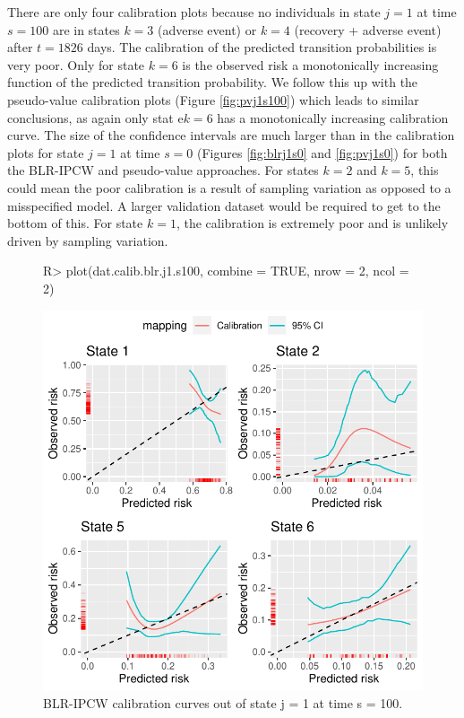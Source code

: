 \documentclass[article,shortnames]{jss}
\begin{document}
There are only four calibration plots because no individuals in state $j = 1$ at time $s = 100$ are in states $k = 3$ (adverse event) or $k = 4$ (recovery + adverse event) after $t = 1826$ days. The calibration of the predicted transition probabilities is very poor. Only for state $k = 6$ is the observed risk a monotonically increasing function of the predicted transition probability. We follow this up with the pseudo-value calibration plots (Figure \ref{fig:pvj1s100}) which leads to similar conclusions, as again only stat e$k = 6$ has a monotonically increasing calibration curve. The size of the confidence intervals are much larger than in the calibration plots for state $j = 1$ at time $s = 0$ (Figures \ref{fig:blrj1s0} and \ref{fig:pvj1s0}) for both the BLR-IPCW and pseudo-value approaches. For states $k = 2$ and $k = 5$, this could mean the poor calibration is a result of sampling variation as opposed to a misspecified model. A larger validation dataset would be required to get to the bottom of this. For state $k = 1$, the calibration is extremely poor and is unlikely driven by sampling variation.

\begin{figure}
\centering
\begin{Schunk}
\begin{Sinput}
R> plot(dat.calib.blr.j1.s100, combine = TRUE, nrow = 2, ncol = 2)
\end{Sinput}
\end{Schunk}
\includegraphics{calibmsm-jss-TEST-012}
\caption{\label{fig:blrj1s100} BLR-IPCW calibration curves out of state j =  1 at time s = 100.}
\end{figure}
\end{document}

